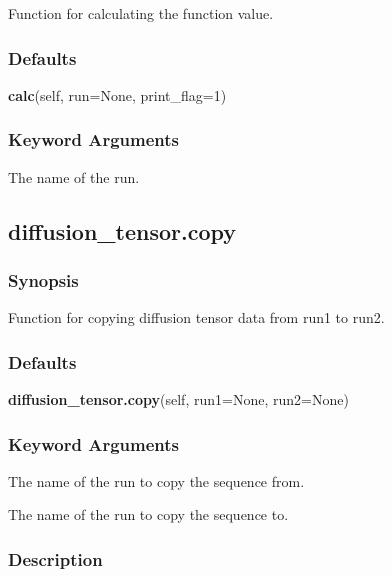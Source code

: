 Function for calculating the function value.



\subsubsection{Defaults}

\textsf{\textbf{calc}(self, run=None, print\_flag=1)}


\subsubsection{Keyword Arguments}

  The name of the run. 





\newpage

\subsection{diffusion\_tensor.copy}


\subsubsection{Synopsis}

Function for copying diffusion tensor data from run1 to run2.



\subsubsection{Defaults}

\textsf{\textbf{diffusion\_tensor.copy}(self, run1=None, run2=None)}


\subsubsection{Keyword Arguments}

  The name of the run to copy the sequence from. 

  The name of the run to copy the sequence to. 




\subsubsection{Description}

